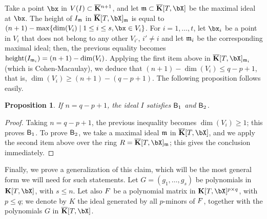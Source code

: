 \documentclass[12pt]{article}
\newtheorem{proposition}[definition]{Proposition}
\begin{document}
Take a point $\bx$ in $V(I)\subset \overline{\mathbf{K}}{}^{n+1}$, and let $\m \subset
\KKbar[T,\bX]$ be the maximal ideal at $\bx$. The height of
$I_{\mathfrak{m}}$ in $\KKbar[T,\bX]_\m$ is equal to $(n+1)-\max\{ \dim(V_i)
\mid 1 \le i \le s, \bx \in V_i\}$. For $i=1,\dots,t$, let $\bx_i$
be a point in $V_i$ that does not belong to any other $V_{i'}$, $i'
\ne i$ and let $\mathfrak{m}_i$ be the corresponding maximal ideal; then, the
previous equality becomes ${\rm height}(I_{\mathfrak{m}_i})=(n+1)-\dim(V_i)$.
Applying the first item above in $\KKbar[T,\bX]_{\m_i}$ (which
is Cohen-Macaulay), we deduce that $(n+1)-\dim(V_i) \le q-p+1$, that is,
$\dim(V_i) \ge (n+1) -(q-p+1)$. The following proposition
follows easily.

\begin{proposition}
  If $n=q-p+1$, the ideal $I$ satisfies $\mathsf{B}_1$ and $\mathsf{B}_2$.
\end{proposition}
\begin{proof}
  Taking $n=q-p+1$, the previous inequality becomes $\dim(V_i) \ge 1$;
  this proves $\mathsf{B}_1$.  To prove $\mathsf{B}_2$, we take a maximal
  ideal $\mathfrak{m}$ in $\KKbar[T,\bX]$, and we apply the second item above
  over the ring $R=\KKbar[T,\bX]_\m$; this gives the conclusion
  immediately.
\end{proof}



Finally, we prove a generalization of this claim, which will be the
most general form we will need for such statements. Let
$G=(g_1,\dots,g_s)$ be polynomials in $\KK[T,\bX]$, with $s \le
n$. Let also ${F}$ be a polynomial matrix in $\KK[T,\bX]^{p \times
  q}$, with $p \le q$; we denote by $K$ the ideal generated by all
$p$-minors of ${F}$, together with the polynomials $G$ in
$\KKbar[T,\bX]$.
\end{document}
